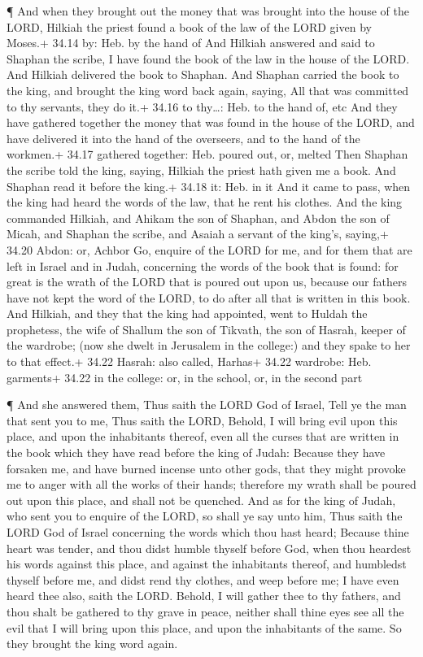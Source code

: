  ¶ And when they brought out the money that was brought
into the house of the LORD, Hilkiah the priest found a book of the law
of the LORD given by Moses.+ 34.14 by: Heb. by the hand of 
And Hilkiah answered and said to Shaphan the scribe, I have found the
book of the law in the house of the LORD. And Hilkiah delivered the book
to Shaphan.  And Shaphan carried the book to the king, and
brought the king word back again, saying, All that was committed to thy
servants, they do it.+ 34.16 to thy\ldots: Heb. to the hand of, etc
 And they have gathered together the money that was found
in the house of the LORD, and have delivered it into the hand of the
overseers, and to the hand of the workmen.+ 34.17 gathered together:
Heb. poured out, or, melted  Then Shaphan the scribe told
the king, saying, Hilkiah the priest hath given me a book. And Shaphan
read it before the king.+ 34.18 it: Heb. in it  And it came
to pass, when the king had heard the words of the law, that he rent his
clothes.  And the king commanded Hilkiah, and Ahikam the
son of Shaphan, and Abdon the son of Micah, and Shaphan the scribe, and
Asaiah a servant of the king's, saying,+ 34.20 Abdon: or, Achbor
 Go, enquire of the LORD for me, and for them that are left
in Israel and in Judah, concerning the words of the book that is found:
for great is the wrath of the LORD that is poured out upon us, because
our fathers have not kept the word of the LORD, to do after all that is
written in this book.  And Hilkiah, and they that the king
had appointed, went to Huldah the prophetess, the wife of Shallum the
son of Tikvath, the son of Hasrah, keeper of the wardrobe; (now she
dwelt in Jerusalem in the college:) and they spake to her to that
effect.+ 34.22 Hasrah: also called, Harhas+ 34.22 wardrobe: Heb.
garments+ 34.22 in the college: or, in the school, or, in the second
part

 ¶ And she answered them, Thus saith the LORD God of
Israel, Tell ye the man that sent you to me,  Thus saith
the LORD, Behold, I will bring evil upon this place, and upon the
inhabitants thereof, even all the curses that are written in the book
which they have read before the king of Judah:  Because
they have forsaken me, and have burned incense unto other gods, that
they might provoke me to anger with all the works of their hands;
therefore my wrath shall be poured out upon this place, and shall not be
quenched.  And as for the king of Judah, who sent you to
enquire of the LORD, so shall ye say unto him, Thus saith the LORD God
of Israel concerning the words which thou hast heard; 
Because thine heart was tender, and thou didst humble thyself before
God, when thou heardest his words against this place, and against the
inhabitants thereof, and humbledst thyself before me, and didst rend thy
clothes, and weep before me; I have even heard thee also, saith the
LORD.  Behold, I will gather thee to thy fathers, and thou
shalt be gathered to thy grave in peace, neither shall thine eyes see
all the evil that I will bring upon this place, and upon the inhabitants
of the same. So they brought the king word again.

